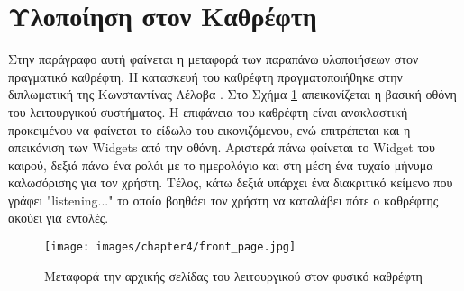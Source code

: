 \section{Υλοποίηση στον Καθρέφτη}
\label{sec:os_mirror}
Στην παράγραφο αυτή φαίνεται η μεταφορά των παραπάνω υλοποιήσεων στον πραγματικό καθρέφτη. Η κατασκευή του καθρέφτη πραγματοποιήθηκε στην διπλωματική της Κωνσταντίνας Λέλοβα \cite{nantia_mirror}. Στο Σχήμα \ref{fig:front_page} απεικονίζεται η βασική οθόνη του λειτουργικού συστήματος. Η επιφάνεια του καθρέφτη είναι ανακλαστική προκειμένου να φαίνεται το είδωλο του εικονιζόμενου, ενώ επιτρέπεται και η απεικόνιση των Widgets από την οθόνη. Αριστερά πάνω φαίνεται το Widget του καιρού, δεξιά πάνω ένα ρολόι με το ημερολόγιο και στη μέση ένα τυχαίο μήνυμα καλωσόρισης για τον χρήστη. Τέλος, κάτω δεξιά υπάρχει ένα διακριτικό κείμενο που γράφει "listening..." το οποίο βοηθάει τον χρήστη να καταλάβει πότε ο καθρέφτης ακούει για εντολές.

\begin{figure}[h]
	\centering
	\texttt{[image: images/chapter4/front\_page.jpg]}
	\caption{Μεταφορά την αρχικής σελίδας του λειτουργικού στον φυσικό καθρέφτη}
	\label{fig:front_page}
\end{figure}